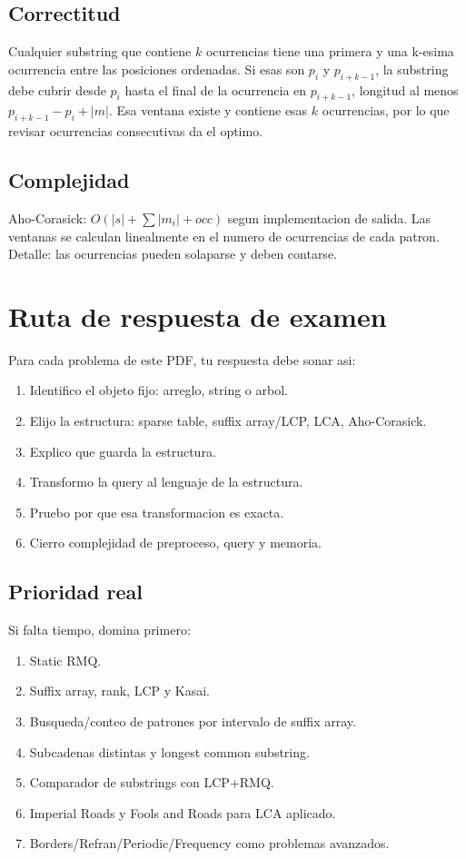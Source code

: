 \documentclass[10pt]{article}
\newcommand{\bigO}{O}
\begin{document}
\subsection{Correctitud}
Cualquier substring que contiene $k$ ocurrencias tiene una primera y una
k-esima ocurrencia entre las posiciones ordenadas. Si esas son $p_i$ y
$p_{i+k-1}$, la substring debe cubrir desde $p_i$ hasta el final de la
ocurrencia en $p_{i+k-1}$, longitud al menos $p_{i+k-1}-p_i+|m|$. Esa ventana
existe y contiene esas $k$ ocurrencias, por lo que revisar ocurrencias
consecutivas da el optimo.

\subsection{Complejidad}
Aho-Corasick: $\bigO(|s|+\sum |m_i|+occ)$ segun implementacion de salida. Las
ventanas se calculan linealmente en el numero de ocurrencias de cada patron.
Detalle: las ocurrencias pueden solaparse y deben contarse.

\newpage

\section{Ruta de respuesta de examen}
Para cada problema de este PDF, tu respuesta debe sonar asi:
\begin{enumerate}[leftmargin=*]
\item Identifico el objeto fijo: arreglo, string o arbol.
\item Elijo la estructura: sparse table, suffix array/LCP, LCA, Aho-Corasick.
\item Explico que guarda la estructura.
\item Transformo la query al lenguaje de la estructura.
\item Pruebo por que esa transformacion es exacta.
\item Cierro complejidad de preproceso, query y memoria.
\end{enumerate}

\subsection*{Prioridad real}
Si falta tiempo, domina primero:
\begin{enumerate}[leftmargin=*]
\item Static RMQ.
\item Suffix array, rank, LCP y Kasai.
\item Busqueda/conteo de patrones por intervalo de suffix array.
\item Subcadenas distintas y longest common substring.
\item Comparador de substrings con LCP+RMQ.
\item Imperial Roads y Fools and Roads para LCA aplicado.
\item Borders/Refran/Periodic/Frequency como problemas avanzados.
\end{enumerate}
\end{document}
